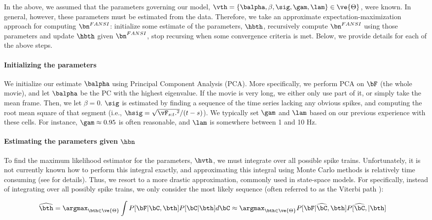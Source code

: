 In the above, we assumed that the parameters governing our model, $\vth=\{\balpha, \beta, \sig, \gam, \lam\} \in \ve{\Theta}$, were known. In general, however, these parameters must be estimated from the data. Therefore, we take an approximate expectation-maximization approach for computing $\bn^{FANSI}$: initialize some estimate of the parameters, $\hbth$, recursively compute $\bn^{FANSI}$ using those parameters and update $\hbth$ given $\bn^{FANSI}$, stop recursing when some convergence criteria is met.  Below, we provide details for each of the above steps.

\paragraph{Initializing the parameters}

We initialize our estimate $\balpha$ using Principal Component Analysis (PCA). More specifically, we perform PCA on $\bF$ (the whole movie), and let $\balpha$ be the PC with the highest eigenvalue.  If the movie is very long, we either only use part of it, or simply take the mean frame.  Then, we let $\beta=0$.  $\sig$ is estimated by finding a sequence of the time series lacking any obvious spikes, and computing the root mean square of that segment (i.e., $\hsig=\sqrt{\vF_{s:t}.^2}/(t-s)$).  We typically set $\gam$ and $\lam$ based on our previous experience with these cells.  For instance, $\gam \approx 0.95$ is often reasonable, and $\lam$ is somewhere between 1 and 10 Hz.  

\paragraph{Estimating the parameters given $\hbn$}

To find the maximum likelihood estimator for the parameters, $\hvth$, we must integrate over all possible spike trains. Unfortunately, it is not currently known how to perform this integral exactly, and approximating this integral using Monte Carlo methods is relatively time consuming (see \cite{VogelsteinPaninski09b} for details).  Thus, we resort to a more drastic approximation, commonly used in state-space models.  For specifically, instead of integrating over all possibly spike trains, we only consider the most likely sequence (often referred to as the Viterbi path \cite{Rabiner89}): 

\begin{align} \label{eq:par1}
\widehat{\bth} &= \argmax_{\bth \in \ve{\Theta}} \int P[\bF|\bC, \bth] P[\bC | \bth]  d\bC  \approx \argmax_{\bth \in \ve{\Theta}}P[\bF| \hCm, \bth] P[\hCm, | \bth]
\end{align}

